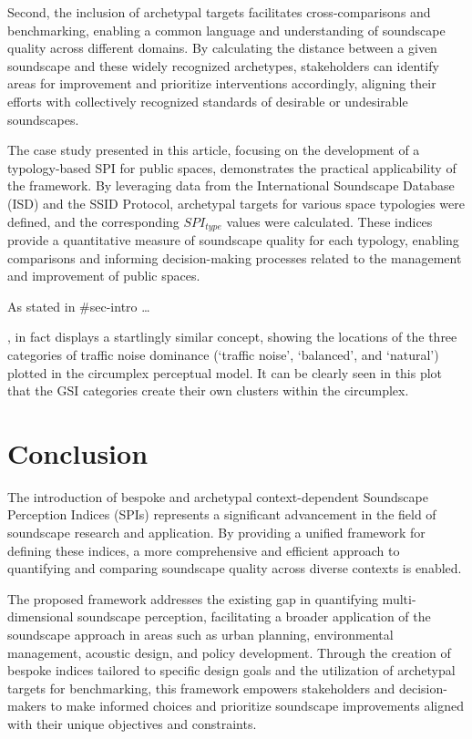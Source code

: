 \documentclass[
  authoryear,
  preprint,
  3p]{elsarticle}
\begin{document}
Second, the inclusion of archetypal targets facilitates
cross-comparisons and benchmarking, enabling a common language and
understanding of soundscape quality across different domains. By
calculating the distance between a given soundscape and these widely
recognized archetypes, stakeholders can identify areas for improvement
and prioritize interventions accordingly, aligning their efforts with
collectively recognized standards of desirable or undesirable
soundscapes.

The case study presented in this article, focusing on the development of
a typology-based SPI for public spaces, demonstrates the practical
applicability of the framework. By leveraging data from the
International Soundscape Database (ISD) and the SSID Protocol,
archetypal targets for various space typologies were defined, and the
corresponding \(SPI_{type}\) values were calculated. These indices
provide a quantitative measure of soundscape quality for each typology,
enabling comparisons and informing decision-making processes related to
the management and improvement of public spaces.

As stated in \#sec-intro \ldots{}

\citep[Fig.6]{Kogan2018Green}, in fact displays a startlingly similar
concept, showing the locations of the three categories of traffic noise
dominance (`traffic noise', `balanced', and `natural') plotted in the
circumplex perceptual model. It can be clearly seen in this plot that
the GSI categories create their own clusters within the circumplex.

\section{Conclusion}\label{conclusion}

The introduction of bespoke and archetypal context-dependent Soundscape
Perception Indices (SPIs) represents a significant advancement in the
field of soundscape research and application. By providing a unified
framework for defining these indices, a more comprehensive and efficient
approach to quantifying and comparing soundscape quality across diverse
contexts is enabled.

The proposed framework addresses the existing gap in quantifying
multi-dimensional soundscape perception, facilitating a broader
application of the soundscape approach in areas such as urban planning,
environmental management, acoustic design, and policy development.
Through the creation of bespoke indices tailored to specific design
goals and the utilization of archetypal targets for benchmarking, this
framework empowers stakeholders and decision-makers to make informed
choices and prioritize soundscape improvements aligned with their unique
objectives and constraints.
\end{document}
